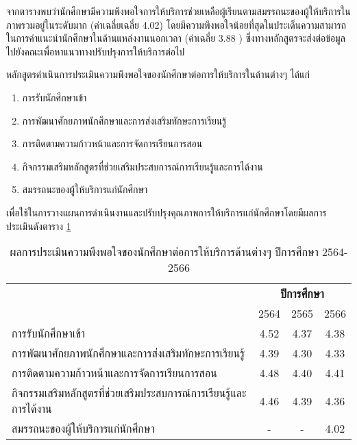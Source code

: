   จากตารางพบว่านักศึกษามีความพึงพอใจการให้บริการช่วยเหลือผู้เรียนตามสมรรถนะของผู้ให้บริการในภาพรวมอยู่ในระดับมาก (ค่าเฉลี่ยเฉลี่ย 4.02) โดยมีความพึงพอใจน้อยที่สุดในประเด็นความสามารถในการคำแนะนำนักศึกษาในด้านแหล่งงานนอกเวลา  (ค่าเฉลี่ย 3.88 ) ซึ่งทางหลักสูตรจะส่งต่อข้อมูลไปยังคณะเพื่อหาแนวทางปรับปรุงการให้บริการต่อไป 
\begin{doclist}
\end{doclist}
\noindent
หลักสูตรดำเนินการประเมินความพึงพอใจของนักศึกษาต่อการให้บริการในด้านต่างๆ ได้แก่
\begin{enumerate}
\item การรับนักศึกษาเข้า
\item การพัฒนาศักยภาพนักศึกษาและการส่งเสริมทักษะการเรียนรู้
\item การติดตามความก้าวหน้าและการจัดการเรียนการสอน
\item กิจกรรมเสริมหลักสูตรที่ช่วยเสริมประสบการณ์การเรียนรู้และการได้งาน
\item สมรรถนะของผู้ให้บริการแก่นักศึกษา
\end{enumerate}

เพื่อใช้ในการวางแผนการดำเนินงานและปรับปรุงคุณภาพการให้บริการแก่นักศึกษาโดยมีผลการประเมินดังตาราง \ref{Table:StudentSupSer}
   \begin{longtable}{|>{\raggedright}p{9cm}|c|c|c|}
   	\caption{ผลการประเมินความพึงพอใจของนักศึกษาต่อการให้บริการด้านต่างๆ ปีการศึกษา 2564-2566}
   	\label{Table:StudentSupSer}\\
	\hline
	\multicolumn{1}{|c|}{\textbf{การประเมินความพึงพอใจของนักศึกษา}}&\multicolumn{3}{c|}{\textbf{ปีการศึกษา}}\\
	\cline{2-4}
	&2564&2565&2566\\\hline
	การรับนักศึกษาเข้า&4.52 &4.37 &4.38 \\\hline
	การพัฒนาศักยภาพนักศึกษาและการส่งเสริมทักษะการเรียนรู้ &4.39 &4.30 &4.33 \\\hline
	การติดตามความก้าวหน้าและการจัดการเรียนการสอน&4.48 &4.40 &4.41 \\\hline
	กิจกรรมเสริมหลักสูตรที่ช่วยเสริมประสบการณ์การเรียนรู้\newline และการได้งาน &4.46 &4.39 &4.36 \\\hline
	สมรรถนะของผู้ให้บริการแก่นักศึกษา&- &- & 4.02\\\hline
	
	\end{longtable}

